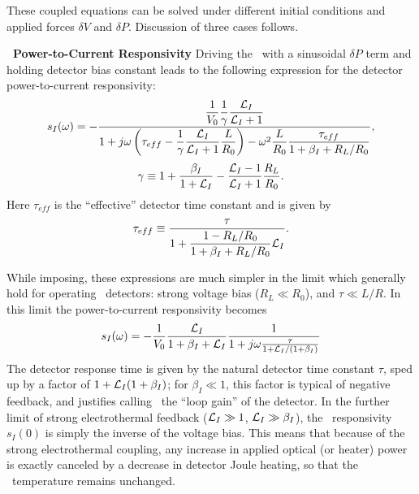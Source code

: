 These coupled equations can be solved under different initial conditions and applied forces $\delta V$ and $\delta P$.
Discussion of three cases follows.

\textbf{\TES\ Power-to-Current Responsivity}
Driving the \TES\ with a sinusoidal $\delta P$ term and holding detector bias constant leads to the following expression for the detector power-to-current responsivity:
\begin{equation}\label{eqn:si-full}
s_I(\omega) = 
- \dfrac{ \dfrac{1}{V_0} \dfrac{1}{\gamma} \dfrac{\mathcal{L}_I}{\mathcal{L}_I + 1} }
       { 1 + j \omega \left( \tau_{eff} - \dfrac{1}{\gamma}\dfrac{\mathcal{L}_I}{\mathcal{L}_I + 1} \dfrac{L}{R_0}\right) - \omega^2 \dfrac{L}{R_0}\dfrac{\tau_{eff}}{1 + \beta_I + R_L / R_0}},
\end{equation}
\begin{equation}
\gamma \equiv 1 + \dfrac{\beta_I}{1+\mathcal{L}_I} - \dfrac{\mathcal{L}_I - 1}{\mathcal{L}_I + 1}\dfrac{R_L}{R_0}.
\end{equation}
Here $\tau_{eff}$ is the ``effective'' detector time constant and is given by
\begin{equation} \label{eqn:teff}
  \tau_{eff} \equiv \dfrac{\tau}{1 + \dfrac{1 - R_L / R_0}{1 + \beta_I + R_L / R_0} \mathcal{L}_I}.
\end{equation}

While imposing, these expressions are much simpler in the limit which generally hold for operating \TES\ detectors: strong voltage bias ($R_L \ll R_0$), and $\tau \ll L/R$. 
In this limit the power-to-current responsivity becomes
\begin{equation}
s_I(\omega) = -\dfrac{1}{V_0} \dfrac{\mathcal{L}_I}{1+\beta_I + \mathcal{L}_I} \dfrac{1}{1 + j \omega \frac{\tau}{1 +\mathcal{L}_I/(1+\beta_I)}}
\end{equation}
The detector response time is given by the natural detector time constant $\tau$, sped up by a factor of $1 + \mathcal{L}_I(1+\beta_I)$; for $\beta_I \ll 1$, this factor is typical of negative feedback, and justifies calling \Loop\ the ``loop gain'' of the detector.
In the further limit of strong electrothermal feedback ($\mathcal{L}_I \gg 1$, $\mathcal{L}_I \gg \beta_I$), the \DC\ responsivity $s_I(0)$ is simply the inverse of the voltage bias.
This means that because of the strong electrothermal coupling, any increase in applied optical (or heater) power is exactly canceled by a decrease in detector Joule heating, so that the \TES\ temperature remains unchanged.

